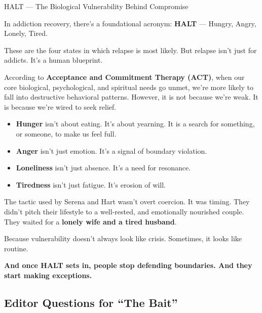 \begin{TechnicalSidebar}{HALT --- The Biological Vulnerability Behind Compromise}

  In addiction recovery, there’s a foundational acronym: \textbf{HALT} — Hungry, Angry, Lonely, Tired.

  \medskip
  
  These are the four states in which relapse is most likely.  
  But relapse isn’t just for addicts. It’s a human blueprint.
  
  \medskip
  
  According to \textbf{Acceptance and Commitment Therapy (ACT)}, when our core biological, psychological, 
  and spiritual needs go unmet, we’re 
  more likely to fall into destructive behavioral patterns. However, it is not because we’re weak. 
  It is because we’re wired to seek relief.  
  
  \medskip
 
  \begin{itemize}
    \item \textbf{Hunger} isn’t about eating. It’s about yearning.
  It is a search for something, or someone, to make us feel full.


    \item \textbf{Anger} isn’t just emotion. It’s a signal of boundary violation.  


    \item \textbf{Loneliness} isn’t just absence. It’s a need for resonance.  


    \item \textbf{Tiredness} isn’t just fatigue. It’s erosion of will.
  \end{itemize}
  
  \medskip
  
  The tactic used by Serena and Hart wasn’t overt coercion. It was timing.  
  They didn’t pitch their lifestyle to a well-rested, and emotionally nourished couple.  
  They waited for a \textbf{lonely wife and a tired husband}.

  \medskip
  
  Because vulnerability doesn’t always look like crisis.  
  Sometimes, it looks like routine.
  
  \medskip
  
  \textbf{And once HALT sets in, people stop defending boundaries. And they start making exceptions.}

\end{TechnicalSidebar}


\subsection*{Editor Questions for ``The Bait''}

